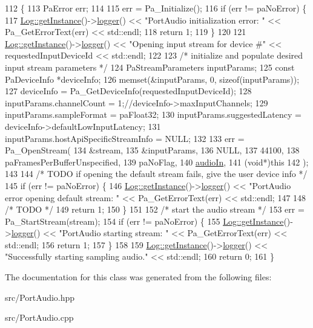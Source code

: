 \begin{DoxyCode}
112 \{
113     PaError err;
114     
115     err = Pa\_Initialize();
116     \textcolor{keywordflow}{if} (err != paNoError) \{
117         \mbox{\hyperlink{classLog_a987f3ff401eea783d0e80daaea1d7aca}{Log::getInstance}}()->\mbox{\hyperlink{classLog_a32d048a4924c7851c4b7b16758675af6}{logger}}() << \textcolor{stringliteral}{"PortAudio initialization error: "} << 
      Pa\_GetErrorText(err) << std::endl;
118         \textcolor{keywordflow}{return} 1;
119     \}
120 
121     \mbox{\hyperlink{classLog_a987f3ff401eea783d0e80daaea1d7aca}{Log::getInstance}}()->\mbox{\hyperlink{classLog_a32d048a4924c7851c4b7b16758675af6}{logger}}() << \textcolor{stringliteral}{"Opening input stream for device #"} << 
      requestedInputDeviceId << std::endl;
122 
123     \textcolor{comment}{/* initialize and populate desired input stream parameters */}
124     PaStreamParameters inputParams;
125     \textcolor{keyword}{const} PaDeviceInfo *deviceInfo;
126     memset(&inputParams, 0, \textcolor{keyword}{sizeof}(inputParams));
127     deviceInfo = Pa\_GetDeviceInfo(requestedInputDeviceId);
128     inputParams.channelCount = 1;\textcolor{comment}{//deviceInfo->maxInputChannels;}
129     inputParams.sampleFormat = paFloat32;
130     inputParams.suggestedLatency = deviceInfo->defaultLowInputLatency;
131     inputParams.hostApiSpecificStreamInfo = NULL;
132 
133     err = Pa\_OpenStream(
134             &stream,
135             &inputParams,
136             NULL,
137             44100,
138             paFramesPerBufferUnspecified,
139             paNoFlag,
140             \mbox{\hyperlink{classPortAudio_a006e388f2b3e886377390e1a97580d53}{audioIn}},
141             (\textcolor{keywordtype}{void}*)\textcolor{keyword}{this}
142     );
143     
144     \textcolor{comment}{/* TODO if opening the default stream fails, give the user device info */}
145     \textcolor{keywordflow}{if} (err != paNoError) \{
146         \mbox{\hyperlink{classLog_a987f3ff401eea783d0e80daaea1d7aca}{Log::getInstance}}()->\mbox{\hyperlink{classLog_a32d048a4924c7851c4b7b16758675af6}{logger}}() << \textcolor{stringliteral}{"PortAudio error opening default stream: "} <<
       Pa\_GetErrorText(err) << std::endl;
147 
148         \textcolor{comment}{/* TODO */}
149         \textcolor{keywordflow}{return} 1;
150     \}
151 
152     \textcolor{comment}{/* start the audio stream */}
153     err = Pa\_StartStream(stream);
154     \textcolor{keywordflow}{if} (err != paNoError) \{
155         \mbox{\hyperlink{classLog_a987f3ff401eea783d0e80daaea1d7aca}{Log::getInstance}}()->\mbox{\hyperlink{classLog_a32d048a4924c7851c4b7b16758675af6}{logger}}() << \textcolor{stringliteral}{"PortAudio starting stream: "} << 
      Pa\_GetErrorText(err) << std::endl;
156         \textcolor{keywordflow}{return} 1;
157     \}
158     
159     \mbox{\hyperlink{classLog_a987f3ff401eea783d0e80daaea1d7aca}{Log::getInstance}}()->\mbox{\hyperlink{classLog_a32d048a4924c7851c4b7b16758675af6}{logger}}() << \textcolor{stringliteral}{"Successfully starting sampling audio."} << 
      std::endl;
160     \textcolor{keywordflow}{return} 0;
161 \}
\end{DoxyCode}


The documentation for this class was generated from the following files\+:\begin{DoxyCompactItemize}
\item 
src/Port\+Audio.\+hpp\item 
src/Port\+Audio.\+cpp\end{DoxyCompactItemize}
